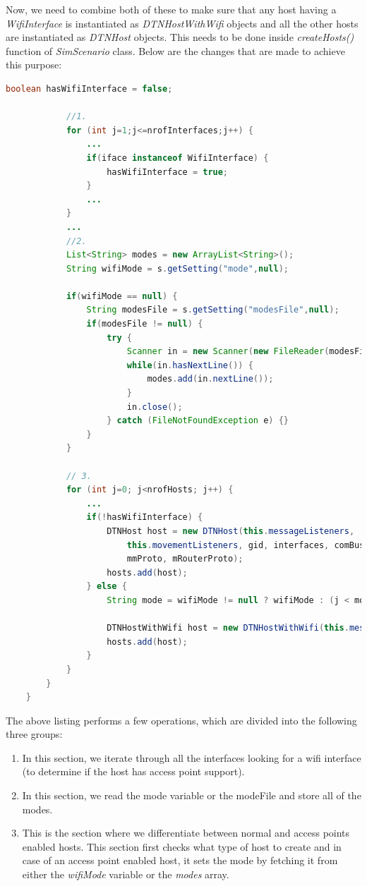 Now, we need to combine both of these to make sure that any host having a \textit{WifiInterface} is instantiated as \textit{DTNHostWithWifi} objects and all the other hosts are instantiated as \textit{DTNHost} objects. This needs to be done inside \textit{createHosts()} function of \textit{SimScenario} class. Below are the changes that are made to achieve this purpose:
\vspace{3mm}
\begin{lstlisting}[language=java]
			boolean hasWifiInterface = false;

			//1.
			for (int j=1;j<=nrofInterfaces;j++) {
				...
				if(iface instanceof WifiInterface) {
					hasWifiInterface = true;
				}
				...
			}
			...
			//2.
			List<String> modes = new ArrayList<String>();
			String wifiMode = s.getSetting("mode",null);

			if(wifiMode == null) {
				String modesFile = s.getSetting("modesFile",null);
				if(modesFile != null) {
					try {
						Scanner in = new Scanner(new FileReader(modesFile));
						while(in.hasNextLine()) {
							modes.add(in.nextLine());
						}
						in.close();
					} catch (FileNotFoundException e) {}
				}
			}

			// 3.
			for (int j=0; j<nrofHosts; j++) {
				...
				if(!hasWifiInterface) {
					DTNHost host = new DTNHost(this.messageListeners,
						this.movementListeners,	gid, interfaces, comBus,
						mmProto, mRouterProto);
					hosts.add(host);
				} else {
					String mode = wifiMode != null ? wifiMode : (j < modes.size() ? modes.get(j) : "");

					DTNHostWithWifi host = new DTNHostWithWifi(this.messageListeners, this.movementListeners, gid, interfaces, comBus, mmProto, mRouterProto,  mode: mode);
					hosts.add(host);
				}
			}
		}
	}
\end{lstlisting}
\vspace{3mm}
The above listing performs a few operations, which are divided into the following three groups:
\begin{enumerate}
	\item In this section, we iterate through all the interfaces looking for a wifi interface (to determine if the host has access point support).
	\item In this section, we read the mode variable or the modeFile and store all of the modes.
	\item This is the section where we differentiate between normal and access points enabled hosts. This section first checks what type of host to create and in case of an access point enabled host, it sets the mode by fetching it from either the \textit{wifiMode} variable or the \textit{modes} array.
\end{enumerate}
